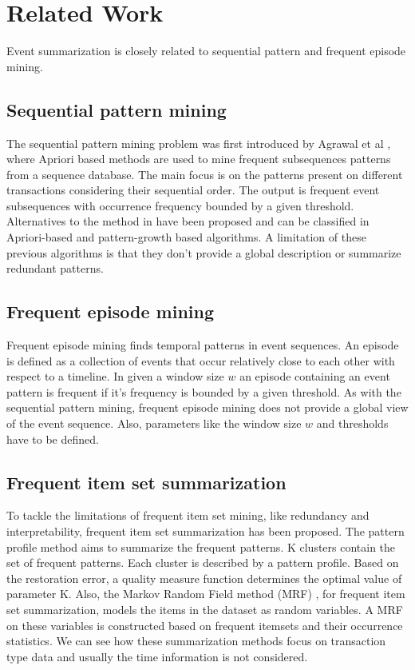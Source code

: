 \section{Related Work}
Event summarization is closely related to sequential pattern and frequent episode mining. 
\subsection{Sequential pattern mining}
The sequential pattern mining problem was first introduced by Agrawal et al \cite{Agrawal:1995}, where Apriori based methods are used to mine frequent subsequences patterns from a sequence database. The main focus is on the patterns present on different transactions considering their sequential order. The output is frequent event subsequences with occurrence frequency bounded by a given threshold.  Alternatives to the method in \cite{Agrawal:1995} have been proposed and can be classified in Apriori-based 
\cite{Garofalakis:1999,Zaki:2001,Ayres:2002} 
and pattern-growth based 
\cite{jianpei:2004,Pei:2007} 
algorithms. A limitation of these previous algorithms is that they don't provide a global description or 
summarize redundant patterns. 
\subsection{Frequent episode mining}
Frequent episode mining finds temporal patterns in event sequences. An episode is defined as a collection of events that occur relatively close to each other with respect to a timeline. In 
\cite{Mannila1997,Patnaik:2012} 
given a window size $w$ an episode containing an event pattern is frequent if it's frequency is bounded by a given threshold. As with the sequential pattern mining, frequent episode mining does not provide a global view of the event sequence. Also, parameters like the window size $w$ and thresholds have to be defined. 
\subsection{Frequent item set summarization}
To tackle the limitations of frequent item set mining, like redundancy and interpretability, frequent item set summarization has been proposed. The pattern profile method \cite{Yan:2005} aims to summarize the frequent patterns. K clusters contain the set of frequent patterns. Each cluster is described by a pattern profile. Based on the restoration error, a quality measure function determines the optimal value of parameter K. Also, the Markov Random Field method (MRF) \cite{Wang:2006}, for frequent item set summarization, models the items in the dataset as random variables. A MRF on these variables is constructed based on frequent itemsets and their occurrence statistics. We can see how these summarization methods focus on transaction type data and usually the time information is not considered.
